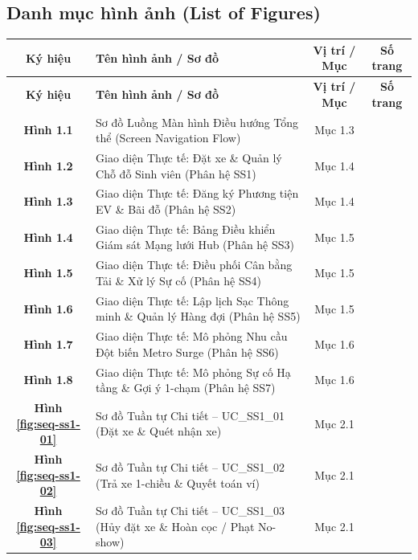\documentclass[12pt,a4paper]{article}
\begin{document}
\subsection*{Danh mục hình ảnh (List of Figures)}
\renewcommand{\arraystretch}{1.15}
\small
\begin{longtable}{|c|p{8.5cm}|c|c|}
    \hline
    \textbf{Ký hiệu} & \textbf{Tên hình ảnh / Sơ đồ} & \textbf{Vị trí / Mục} & \textbf{Số trang} \\
    \hline
    \endfirsthead
    \hline
    \textbf{Ký hiệu} & \textbf{Tên hình ảnh / Sơ đồ} & \textbf{Vị trí / Mục} & \textbf{Số trang} \\
    \hline
    \endhead
    \hline
    \endfoot
    \textbf{Hình 1.1} & Sơ đồ Luồng Màn hình Điều hướng Tổng thể (Screen Navigation Flow) & Mục 1.3 & \pageref{fig:screen-flow} \\
    \hline
    \textbf{Hình 1.2} & Giao diện Thực tế: Đặt xe \& Quản lý Chỗ đỗ Sinh viên (Phân hệ SS1) & Mục 1.4 & \pageref{fig:ui-ss1-real} \\
    \hline
    \textbf{Hình 1.3} & Giao diện Thực tế: Đăng ký Phương tiện EV \& Bãi đỗ (Phân hệ SS2) & Mục 1.4 & \pageref{fig:ui-ss2-real} \\
    \hline
    \textbf{Hình 1.4} & Giao diện Thực tế: Bảng Điều khiển Giám sát Mạng lưới Hub (Phân hệ SS3) & Mục 1.5 & \pageref{fig:ui-ss3-real} \\
    \hline
    \textbf{Hình 1.5} & Giao diện Thực tế: Điều phối Cân bằng Tải \& Xử lý Sự cố (Phân hệ SS4) & Mục 1.5 & \pageref{fig:ui-ss4-real} \\
    \hline
    \textbf{Hình 1.6} & Giao diện Thực tế: Lập lịch Sạc Thông minh \& Quản lý Hàng đợi (Phân hệ SS5) & Mục 1.5 & \pageref{fig:ui-ss5-real} \\
    \hline
    \textbf{Hình 1.7} & Giao diện Thực tế: Mô phỏng Nhu cầu Đột biến Metro Surge (Phân hệ SS6) & Mục 1.6 & \pageref{fig:ui-ss6-real} \\
    \hline
    \textbf{Hình 1.8} & Giao diện Thực tế: Mô phỏng Sự cố Hạ tầng \& Gợi ý 1-chạm (Phân hệ SS7) & Mục 1.6 & \pageref{fig:ui-ss7-real} \\
    \hline
    \textbf{Hình \ref{fig:seq-ss1-01}} & Sơ đồ Tuần tự Chi tiết -- UC\_SS1\_01 (Đặt xe \& Quét nhận xe) & Mục 2.1 & \pageref{fig:seq-ss1-01} \\
    \hline
    \textbf{Hình \ref{fig:seq-ss1-02}} & Sơ đồ Tuần tự Chi tiết -- UC\_SS1\_02 (Trả xe 1-chiều \& Quyết toán ví) & Mục 2.1 & \pageref{fig:seq-ss1-02} \\
    \hline
    \textbf{Hình \ref{fig:seq-ss1-03}} & Sơ đồ Tuần tự Chi tiết -- UC\_SS1\_03 (Hủy đặt xe \& Hoàn cọc / Phạt No-show) & Mục 2.1 & \pageref{fig:seq-ss1-03} \\

\end{longtable}
\end{document}

